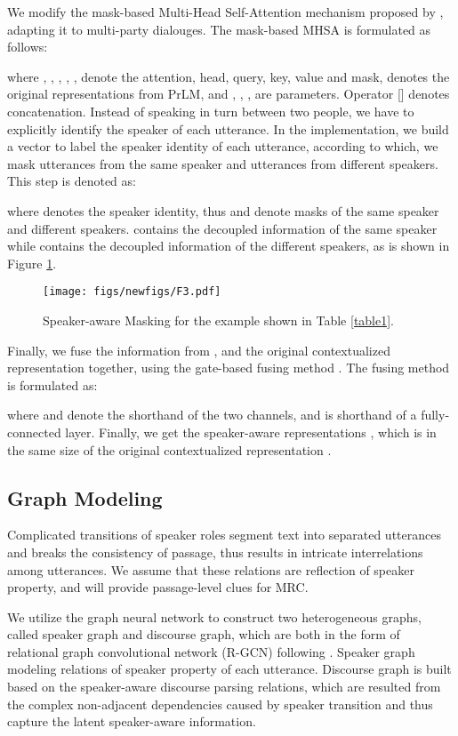 \documentclass[letterpaper]{article} \usepackage{stylefile}  \usepackage{times}  \usepackage{helvet}  \usepackage{courier}  \usepackage[hyphens]{url}  \usepackage{graphicx} \urlstyle{rm} \def\UrlFont{\rm}  \usepackage{natbib}  \usepackage{caption} \DeclareCaptionStyle{ruled}{labelfont=normalfont,labelsep=colon,strut=off} \frenchspacing  \setlength{\pdfpagewidth}{8.5in}  \setlength{\pdfpageheight}{11in}  \usepackage{algorithm}
\begin{document}
We modify the mask-based Multi-Head Self-Attention mechanism proposed by \citet{liumdfn}, adapting it to multi-party dialouges. The mask-based MHSA is formulated as follows:


where , , , , ,  denote the attention, head, query, key, value and mask,  denotes the original representations from PrLM, and , , ,  are parameters. Operator [] denotes concatenation.
Instead of speaking in turn between two people, we have to explicitly identify the speaker of each utterance. In the implementation, we build a vector to label the speaker identity of each utterance, according to which, we mask utterances from the same speaker and utterances from different speakers. This step is denoted as:


where  denotes the speaker identity, thus  and  denote masks of the same speaker and different speakers.  contains the decoupled information of the same speaker while  contains the decoupled information of the different speakers, as is shown in Figure \ref{mask}.
\begin{figure}[hbt]
		\centering
		\texttt{[image: figs/newfigs/F3.pdf]}
		\caption{\label{mask} Speaker-aware Masking for the example shown in Table \ref{table1}.}
\end{figure}

Finally, we fuse the information from ,  and the original contextualized representation  together, using the gate-based fusing method \cite{liumdfn}. The fusing method is formulated as:

where  and  denote the shorthand of the two channels, and  is shorthand of a fully-connected layer. Finally, we get the speaker-aware representations , which is in the same size of the original contextualized representation .

\subsection{Graph Modeling}
 Complicated transitions of speaker roles segment text into separated utterances and breaks the consistency of passage, thus results in intricate interrelations among utterances. We assume that these relations are reflection of speaker property, and will provide passage-level clues for MRC.


 We utilize the graph neural network to construct two heterogeneous graphs, called speaker graph and discourse graph, which are both in the form of relational graph convolutional network (R-GCN) following \citet{schlichtkrull2017modeling}. Speaker graph modeling relations of speaker property of each utterance. Discourse graph is built based on the speaker-aware discourse parsing relations, which are resulted from the complex non-adjacent dependencies caused by speaker transition and thus capture the latent speaker-aware information.
\end{document}
